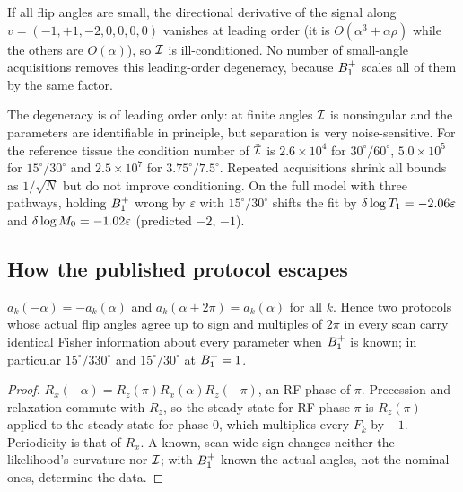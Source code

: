 \begin{corollary}\label{cor:degenerate}
If all flip angles are small, the directional derivative of the signal along
$v=(-1,+1,-2,0,0,0,0)$ vanishes at leading order (it is $O(\alpha^3+\alpha\rho)$ while the others
are $O(\alpha)$), so $\mathcal{I}$ is ill-conditioned. No number of small-angle acquisitions removes this
leading-order degeneracy, because $B_1^{+}$ scales all of them by the same factor.
\end{corollary}

The degeneracy is of leading order only: at finite angles $\mathcal{I}$ is nonsingular and the
parameters are identifiable in principle, but separation is very noise-sensitive. For the
reference tissue the condition number of $\tilde{\mathcal{I}}$ is $2.6\times10^4$ for $30^\circ/60^\circ$,
$5.0\times10^5$ for $15^\circ/30^\circ$ and $2.5\times10^7$ for $3.75^\circ/7.5^\circ$. Repeated
acquisitions shrink all bounds as $1/\sqrt N$ but do not improve conditioning. On the full
model with three pathways, holding $B_1^{+}$ wrong by $\varepsilon$ with $15^\circ/30^\circ$ shifts the
fit by $\delta\log T_1=-2.06\varepsilon$ and $\delta\log M_0=-1.02\varepsilon$ (predicted $-2$, $-1$).

\subsection{How the published protocol escapes}

\begin{proposition}[Periodicity]\label{prop:period}
$a_k(-\alpha)=-a_k(\alpha)$ and $a_k(\alpha+2\pi)=a_k(\alpha)$ for all $k$. Hence two protocols whose
actual flip angles agree up to sign and multiples of $2\pi$ in every scan carry identical
Fisher information about every parameter when $B_1^{+}$ is known; in particular
$15^\circ/330^\circ$ and $15^\circ/30^\circ$ at $B_1^{+}=1$.
\end{proposition}
\begin{proof}
$R_x(-\alpha)=R_z(\pi)R_x(\alpha)R_z(-\pi)$, an RF phase of $\pi$. Precession and relaxation commute
with $R_z$, so the steady state for RF phase $\pi$ is $R_z(\pi)$ applied to the steady state for
phase $0$, which multiplies every $F_k$ by $-1$. Periodicity is that of $R_x$. A known,
scan-wide sign changes neither the likelihood's curvature nor $\mathcal{I}$; with $B_1^{+}$ known the actual
angles, not the nominal ones, determine the data.
\end{proof}

